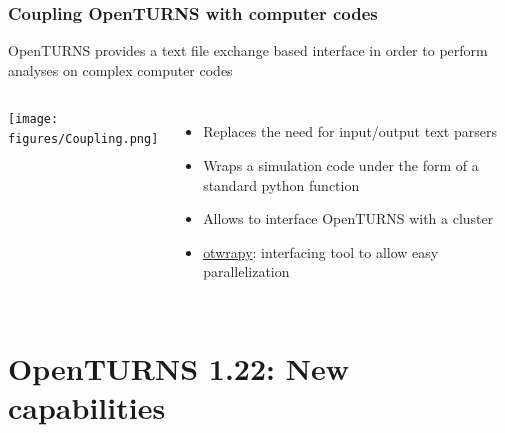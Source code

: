 \documentclass{beamer}
\begin{document}
\begin{frame}[containsverbatim]
  \frametitle{Coupling OpenTURNS with computer codes}
  
  \small
  
  OpenTURNS provides a text file exchange based interface in order to perform analyses on complex computer codes
  
  \vspace{10pt}
  
  \begin{columns}
      
  \centering
  
  \texttt{[image: figures/Coupling.png]}
  
  
  \begin{itemize}
  \item Replaces the need for input/output text parsers
  \item Wraps a simulation code under the form of a standard python function
  \item Allows to interface OpenTURNS with a cluster
  \item \href{https://openturns.github.io/otwrapy/master/index.html}{otwrapy}: interfacing tool to allow easy parallelization
  \end{itemize}
  
  \end{columns}
  
\end{frame}


\section{OpenTURNS 1.22: New capabilities}

\end{document}
